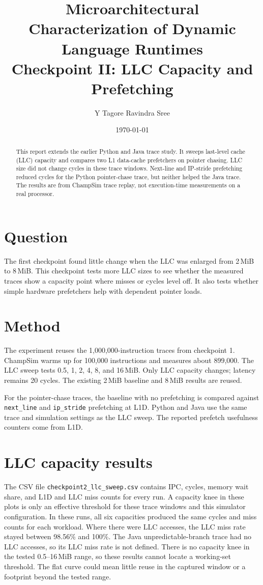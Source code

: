 \documentclass[11pt]{article}
\title{Microarchitectural Characterization of Dynamic Language Runtimes\\
\large Checkpoint II: LLC Capacity and Prefetching}
\author{Y Tagore Ravindra Sree}
\date{\today}
\begin{document}
\maketitle

\begin{abstract}
This report extends the earlier Python and Java trace study. It sweeps last-level
cache (LLC) capacity and compares two L1 data-cache prefetchers on pointer
chasing. LLC size did not change cycles in these trace windows. Next-line and
IP-stride prefetching reduced cycles for the Python pointer-chase trace, but
neither helped the Java trace. The results are from ChampSim trace replay, not
execution-time measurements on a real processor.
\end{abstract}

\section{Question}
The first checkpoint found little change when the LLC was enlarged from
2\,MiB to 8\,MiB. This checkpoint tests more LLC sizes to see whether the
measured traces show a capacity point where misses or cycles level off. It also
tests whether simple hardware prefetchers help with dependent pointer loads.

\section{Method}
The experiment reuses the 1,000,000-instruction traces from checkpoint 1.
ChampSim warms up for 100,000 instructions and measures about 899,000. The
LLC sweep tests 0.5, 1, 2, 4, 8, and 16\,MiB. Only LLC capacity changes;
latency remains 20 cycles. The existing 2\,MiB baseline and 8\,MiB results are
reused.

For the pointer-chase traces, the baseline with no prefetching is compared
against \texttt{next\_line} and \texttt{ip\_stride} prefetching at L1D. Python
and Java use the same trace and simulation settings as the LLC sweep. The
reported prefetch usefulness counters come from L1D.

\section{LLC capacity results}


The CSV file \texttt{checkpoint2\_llc\_sweep.csv} contains IPC, cycles, memory
wait share, and L1D and LLC miss counts for every run. A capacity knee in these
plots is only an effective threshold for these trace windows and this
simulator configuration. In these runs, all six capacities produced the same
cycles and miss counts for each workload. Where there were LLC accesses, the
LLC miss rate stayed between 98.56\% and 100\%. The Java unpredictable-branch
trace had no LLC accesses, so its LLC miss rate is not defined. There is no
capacity knee in the tested 0.5--16\,MiB range, so these results cannot locate
a working-set threshold. The flat curve could mean little reuse in the captured
window or a footprint beyond the tested range.
\end{document}

